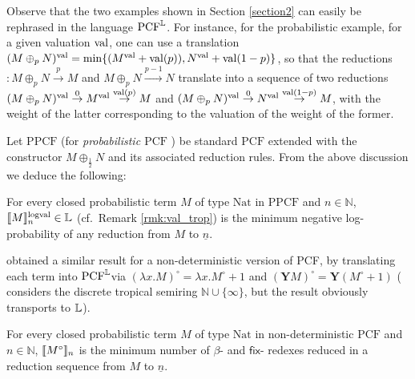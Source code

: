Observe that the two examples shown in Section \ref{section2} can easily be rephrased in the language $\mathrm{PCF}^{\mathbb{L}}$. 
For instance, for the probabilistic example, for a given valuation $\mathrm{val}$, one can use a translation $(M\oplus_{p}N)^{\mathrm{val}}= \min\{(M^{\mathrm{val}}+\mathrm{val}(p)), N^{\mathrm{val}}+\mathrm{val}(1-p)\}$, so that the reductions 
$:M\oplus_{p}N\stackrel{p}{\to} M$ and $M\oplus_{p}N\stackrel{p-1}{\to} N$ translate into a sequence of two reductions
$(M\oplus_{p}N)^{\mathrm{val}} \stackrel{0}{\to} M^{\mathrm{val}}\stackrel{\mathrm{val}(p)}{\to} M$ 
and $(M\oplus_{p}N)^{\mathrm{val}} \stackrel{0}{\to} N^{\mathrm{val}}\stackrel{\mathrm{val}(1-p)}{\to} M$, with the weight of the latter corresponding to the valuation of the weight of the former. 

Let $\mathrm{PPCF}$ (for \emph{probabilistic $\mathrm{PCF}$} \cite{Pagani2018}) be standard $\mathrm{PCF}$ extended with the constructor $M\oplus_{\frac{1}{2}}N$ and its associated reduction rules. From the above discussion we deduce the following:

\begin{corollary}
For every closed probabilistic term $M$ of type $\mathrm{Nat}$ in $\mathrm{PPCF}$ and $n\in \mathbb N$, 
$\llbracket M\rrbracket^{\mathrm{logval}}_{n}\in \mathbb{L}$ (cf.~Remark \ref{rmk:val_trop}) is the minimum negative log-probability of any
reduction from $M$ to $\underline n$.
\end{corollary}


\cite{Manzo2013} obtained a similar result for a non-deterministic version of PCF, by translating each term into $\mathrm{PCF}^{\mathbb{L}}$via $(\lambda x.M)^{\circ}=\lambda x.M^{\circ}+1$ and $(\mathbf YM)^{\circ}= \mathbf Y(M^{\circ}+1)$
(\cite{Manzo2013} considers the discrete tropical semiring $\mathbb N\cup\{\infty\}$, but the result obviously transports to $\mathbb{L}$). 


\begin{corollary}
For every closed probabilistic term $M$ of type $\mathrm{Nat}$ in non-deterministic $\mathrm{PCF}$ and $n\in \mathbb N$, 
$\llbracket M^{\circ}\rrbracket_{n}$ is the minimum number of $\beta$- and $\mathsf{fix}$- redexes reduced in a reduction sequence from $M $ to $\underline n$. 
\end{corollary}

 

